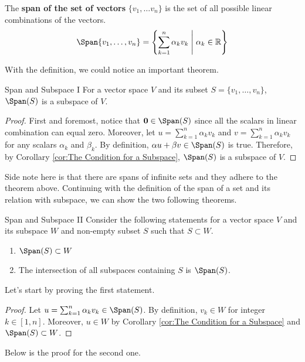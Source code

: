 \documentclass[../main.tex]{subfiles}
\begin{document}
\begin{definition}
The \textbf{span of the set of vectors} $\{ v_1, \ldots v_n \}$ is
the set of all possible linear combinations of the vectors.
\[
\Span\{v_1, \ldots, v_n\}
= \left\{
    \sum_{k = 1}^n \alpha_k v_k \; \middle|\; \alpha_k \in \mathbb{R}
\right\}
\]
\end{definition}

With the definition, we could notice an important theorem.

\begin{theorem}{Span and Subspace I}
For a vector space $V$ and its subset $S = \{ v_1, \ldots, v_n \}$,
$\Span(S)$ is a subspace of $V$.
\end{theorem}
\begin{proof}
First and foremost, notice that $\mathbf{0} \in \Span(S)$ since all
the scalars in linear combination can equal zero. Moreover, let $u =
\sum_{k = 1}^n \alpha_k v_k$ and $v = \sum_{k = 1}^n \alpha_k v_k$ for
any scalars $\alpha_k$ and $\beta_k$. By definition, $\alpha u +
\beta v \in \Span(S)$ is true. Therefore, by Corollary
\ref{cor:The Condition for a Subspace}, $\Span(S)$ is a subspace of
$V$.
\end{proof}

Side note here is that there are spans of infinite sets and they
adhere to the theorem above. Continuing with the definition of the
span of a set and its relation with subspace, we can show the two
following theorems.

\begin{theorem}{Span and Subspace II}
Consider the following statements for a vector space $V$ and its
subspace $W$ and non-empty subset $S$ such that $S \subset W$.
\begin{enumerate}[noitemsep]
\item $\Span(S) \subset W$
\item The intersection of all subspaces containing $S$ is $\Span(S)$.
\end{enumerate}
\end{theorem}

Let's start by proving the first statement.

\begin{proof}
Let $u = \sum_{k = 1}^n \alpha_k v_k \in \Span(S)$. By definition,
$v_k \in W$ for integer $k \in [1, n]$. Moreover, $u \in W$ by
Corollary \ref{cor:The Condition for a Subspace} and $\Span(S)
\subset W$.
\end{proof}

Below is the proof for the second one.
\end{document}
